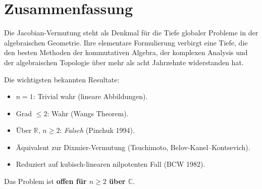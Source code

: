 \documentclass[12pt,a4paper]{amsart}
\theoremstyle{definition}
\theoremstyle{remark}
\begin{document}
\section{Zusammenfassung}

Die Jacobian-Vermutung steht als Denkmal für die Tiefe globaler Probleme in der
algebraischen Geometrie. Ihre elementare Formulierung verbirgt eine Tiefe, die den
besten Methoden der kommutativen Algebra, der komplexen Analysis und der algebraischen
Topologie über mehr als acht Jahrzehnte widerstanden hat.

Die wichtigsten bekannten Resultate:
\begin{itemize}
  \item $n = 1$: Trivial wahr (lineare Abbildungen).
  \item Grad $\leq 2$: Wahr (Wangs Theorem).
  \item Über $\mathbb{R}$, $n \geq 2$: \emph{Falsch} (Pinchuk 1994).
  \item Äquivalent zur Dixmier-Vermutung (Tsuchimoto, Belov-Kanel--Kontsevich).
  \item Reduziert auf kubisch-linearen nilpotenten Fall (BCW 1982).
\end{itemize}

Das Problem ist \textbf{offen für $n \geq 2$ über $\mathbb{C}$}.
\end{document}
